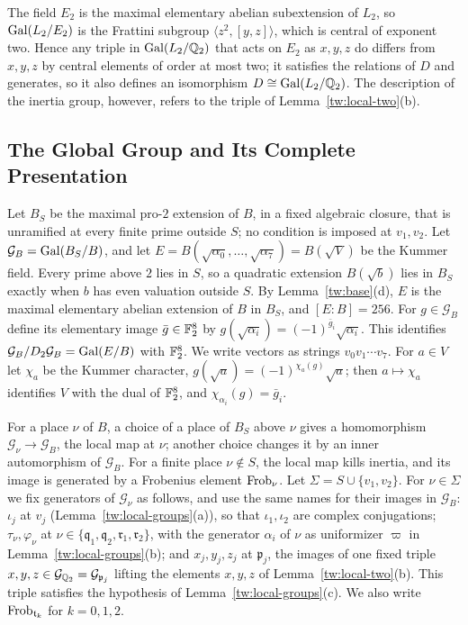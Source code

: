 The field $E_2$ is the maximal elementary abelian subextension of $L_2$, so
$\operatorname{Gal}(L_2/E_2)$ is the Frattini subgroup $\langle z^2,[y,z]\rangle$, which is
central of exponent two. Hence any triple in $\operatorname{Gal}(L_2/\mathbb Q_2)$ that acts on
$E_2$ as $x,y,z$ do differs from $x,y,z$ by central elements of order at
most two; it satisfies the relations of $D$ and generates, so it also
defines an isomorphism $D\cong\operatorname{Gal}(L_2/\mathbb Q_2)$. The description of the
inertia group, however, refers to the triple of
Lemma~\ref{tw:local-two}(b).

\subsection{The Global Group and Its Complete Presentation}\label{tw:global-section}
Let $B_S$ be the maximal pro-$2$ extension of $B$, in a fixed algebraic
closure, that is unramified at every finite prime outside $S$; no condition
is imposed at $v_1,v_2$. Let $\mathcal G_B=\operatorname{Gal}(B_S/B)$, and let
$E=B(\sqrt{\alpha_0},\dots,\sqrt{\alpha_7})=B(\sqrt V)$ be the Kummer field.
Every prime above $2$ lies in $S$, so a quadratic extension $B(\sqrt b)$ lies
in $B_S$ exactly when $b$ has even valuation outside $S$. By
Lemma~\ref{tw:base}(d), $E$ is the maximal elementary abelian extension of
$B$ in $B_S$, and $[E:B]=256$. For $g\in\mathcal G_B$ define its elementary
image $\bar g\in\mathbb F_2^8$ by $g(\sqrt{\alpha_i})=(-1)^{\bar g_i}\sqrt{\alpha_i}$.
This identifies $\mathcal G_B/D_2\mathcal G_B=\operatorname{Gal}(E/B)$ with $\mathbb F_2^8$. We
write vectors as strings $v_0v_1\cdots v_7$. For $a\in V$ let $\chi_a$ be the
Kummer character, $g(\sqrt a)=(-1)^{\chi_a(g)}\sqrt a$; then $a\mapsto\chi_a$
identifies $V$ with the dual of $\mathbb F_2^8$, and $\chi_{\alpha_i}(g)=\bar g_i$.

For a place $\nu$ of $B$, a choice of a place of $B_S$ above $\nu$ gives a
homomorphism $\mathcal G_\nu\to\mathcal G_B$, the local map at $\nu$; another
choice changes it by an inner automorphism of $\mathcal G_B$. For a finite
place $\nu\notin S$, the local map kills inertia, and its image is generated
by a Frobenius element $\operatorname{Frob}_\nu$. Let $\Sigma=S\cup\{v_1,v_2\}$. For
$\nu\in\Sigma$ we fix generators of $\mathcal G_\nu$ as follows, and use the
same names for their images in $\mathcal G_B$: $\iota_j$ at $v_j$
(Lemma~\ref{tw:local-groups}(a)), so that $\iota_1,\iota_2$ are complex
conjugations; $\tau_\nu,\varphi_\nu$ at
$\nu\in\{\mathfrak q_1,\mathfrak q_2,\mathfrak r_1,\mathfrak r_2\}$, with the
generator $\alpha_i$ of $\nu$ as uniformizer $\varpi$ in
Lemma~\ref{tw:local-groups}(b); and $x_j,y_j,z_j$ at $\mathfrak p_j$, the
images of one fixed triple $x,y,z\in\mathcal G_{\mathbb Q_2}=\mathcal G_{\mathfrak p_j}$
lifting the elements $x,y,z$ of Lemma~\ref{tw:local-two}(b). This triple
satisfies the hypothesis of Lemma~\ref{tw:local-groups}(c). We also write
$\operatorname{Frob}_{\mathfrak t_k}$ for $k=0,1,2$.

